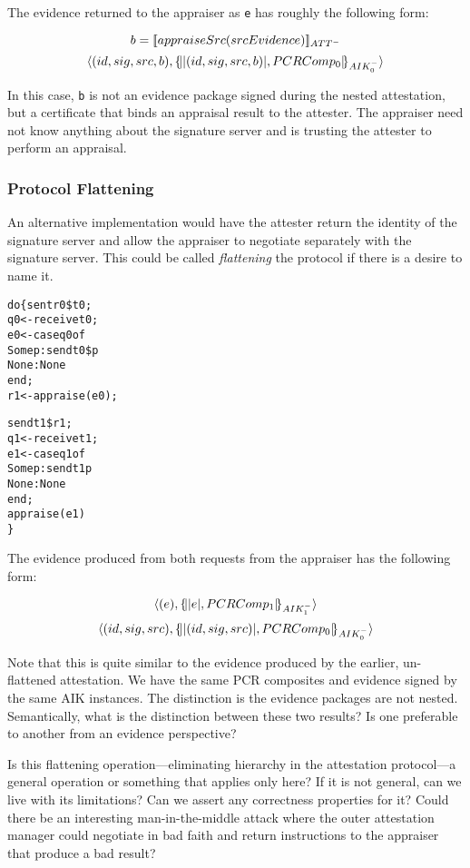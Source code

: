 \documentclass[10pt]{article}
\begin{document}
{The evidence returned to the appraiser as \Verb+e+ has roughly the
following form:

\[b=[\![appraiseSrc(srcEvidence)]\!]_{ATT^{-}}\]
\[\langle (id,sig,src,b),\{\!\lvert \lvert (id,sig,src,b) \rvert,PCRComp_0\rvert\!\}_{AIK_0^{-}}\rangle\]

In this case, \Verb+b+ is not an evidence package signed during the
nested attestation, but a certificate that binds an appraisal result
to the attester.  The appraiser need not know anything about the
signature server and is trusting the attester to perform an
appraisal.

\subsubsection*{Protocol Flattening}

An alternative implementation would have the attester
return the identity of the signature server and allow the appraiser to
negotiate separately with the signature server.  This could be called
\emph{flattening} the protocol if there is a desire to name it.

\begin{alltt}
  do \{ sent r0 \$ t0;
       q0 <- receive t0;
       e0 <- case q0 of
               Some p : send t0 \$ p
               None : None
             end;
       r1 <- appraise(e0);
       
       send t1 \$ r1;
       q1 <- receive t1;
       e1 <- case q1 of
               Some p : send t1 p
               None : None
             end;
       appraise(e1)
  \}
\end{alltt}

The evidence produced from both requests from the appraiser has the
following form:

\[\langle (e),\{\!\lvert \lvert e \rvert,PCRComp_1\rvert\!\}_{AIK_1^{-}}\rangle\]
\[\langle (id,sig,src),\{\!\lvert \lvert (id,sig,src) \rvert,PCRComp_0\rvert\!\}_{AIK_0^{-}}\rangle\]

Note that this is quite similar to the evidence produced by the
earlier, un-flattened attestation.  We have the same PCR composites
and evidence signed by the same AIK instances.  The distinction is the
evidence packages are not nested.  Semantically, what is the
distinction between these two results?  Is one preferable to another
from an evidence perspective?

Is this flattening operation---eliminating hierarchy in the
attestation protocol---a general operation or something that applies
only here?  If it is not general, can we live with its limitations?
Can we assert any correctness properties for it?  Could there be an
interesting man-in-the-middle attack where the outer attestation
manager could negotiate in bad faith and return instructions to the
appraiser that produce a bad result?

}
\end{document}
